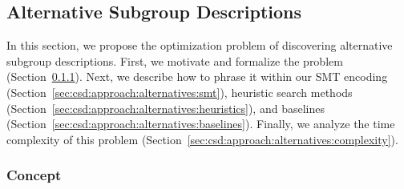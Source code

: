 \documentclass[acmsmall]{acmart} %
\theoremstyle{acmplain}
\theoremstyle{acmdefinition}
\begin{document}
\subsection{Alternative Subgroup Descriptions}
\label{sec:csd:approach:alternatives}

In this section, we propose the optimization problem of discovering alternative subgroup descriptions.
First, we motivate and formalize the problem (Section~\ref{sec:csd:approach:alternatives:concept}).
Next, we describe how to phrase it within our SMT encoding (Section~\ref{sec:csd:approach:alternatives:smt}), heuristic search methods (Section~\ref{sec:csd:approach:alternatives:heuristics}), and baselines (Section~\ref{sec:csd:approach:alternatives:baselines}).
Finally, we analyze the time complexity of this problem (Section~\ref{sec:csd:approach:alternatives:complexity}).

\subsubsection{Concept}
\label{sec:csd:approach:alternatives:concept}
\end{document}
